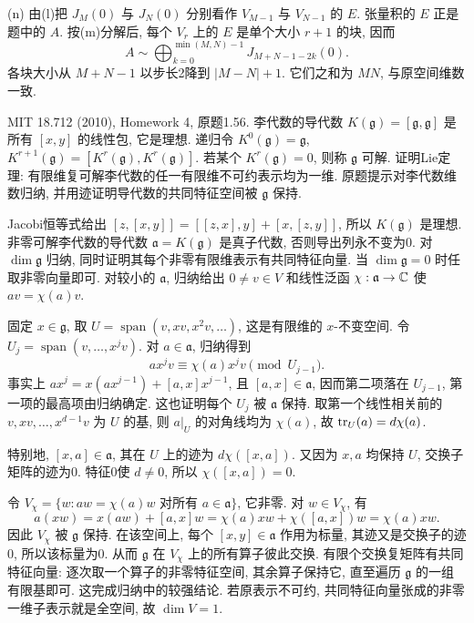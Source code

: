 \begin{solution}
(n) 由(l)把 $J_M(0)$ 与 $J_N(0)$ 分别看作 $V_{M-1}$ 与 $V_{N-1}$ 的 $E$. 张量积的 $E$ 正是题中的 $A$. 按(m)分解后, 每个 $V_r$ 上的 $E$ 是单个大小 $r+1$ 的块, 因而
\[
A\sim\bigoplus_{k=0}^{\min(M,N)-1}J_{M+N-1-2k}(0).
\]
各块大小从 $M+N-1$ 以步长2降到 $|M-N|+1$. 它们之和为 $MN$, 与原空间维数一致.
\end{solution}


\begin{exercise}\label{hw:1.56}
MIT 18.712 (2010), Homework 4, 原题1.56. 李代数的导代数 $K(\mathfrak g)=[\mathfrak g,\mathfrak g]$ 是所有 $[x,y]$ 的线性包, 它是理想. 递归令 $K^0(\mathfrak g)=\mathfrak g$, $K^{r+1}(\mathfrak g)=[K^r(\mathfrak g),K^r(\mathfrak g)]$. 若某个 $K^r(\mathfrak g)=0$, 则称 $\mathfrak g$ 可解. 证明Lie定理: 有限维复可解李代数的任一有限维不可约表示均为一维. 原题提示对李代数维数归纳, 并用迹证明导代数的共同特征空间被 $\mathfrak g$ 保持.
\end{exercise}
\begin{solution}
Jacobi恒等式给出 $[z,[x,y]]=[[z,x],y]+[x,[z,y]]$, 所以 $K(\mathfrak g)$ 是理想. 非零可解李代数的导代数 $\mathfrak a=K(\mathfrak g)$ 是真子代数, 否则导出列永不变为0. 对 $\dim\mathfrak g$ 归纳, 同时证明其每个非零有限维表示有共同特征向量. 当 $\dim\mathfrak g=0$ 时任取非零向量即可. 对较小的 $\mathfrak a$, 归纳给出 $0\ne v\in V$ 和线性泛函 $\chi:\mathfrak a\to\mathbb C$ 使 $av=\chi(a)v$.

固定 $x\in\mathfrak g$, 取 $U=\operatorname{span}(v,xv,x^2v,\ldots)$, 这是有限维的 $x$-不变空间. 令 $U_j=\operatorname{span}(v,\ldots,x^jv)$. 对 $a\in\mathfrak a$, 归纳得到
\[
a x^jv\equiv\chi(a)x^jv\pmod{U_{j-1}}.
\]
事实上 $ax^j=x(ax^{j-1})+[a,x]x^{j-1}$, 且 $[a,x]\in\mathfrak a$, 因而第二项落在 $U_{j-1}$, 第一项的最高项由归纳确定. 这也证明每个 $U_j$ 被 $\mathfrak a$ 保持. 取第一个线性相关前的 $v,xv,\ldots,x^{d-1}v$ 为 $U$ 的基, 则 $a|_U$ 的对角线均为 $\chi(a)$, 故 $\operatorname{tr}_U(a)=d\chi(a)$.

特别地, $[x,a]\in\mathfrak a$, 其在 $U$ 上的迹为 $d\chi([x,a])$. 又因为 $x,a$ 均保持 $U$, 交换子矩阵的迹为0. 特征0使 $d\ne0$, 所以 $\chi([x,a])=0$.

令 $V_\chi=\{w:aw=\chi(a)w\text{ 对所有 }a\in\mathfrak a\}$, 它非零. 对 $w\in V_\chi$, 有
\[
a(xw)=x(aw)+[a,x]w=\chi(a)xw+\chi([a,x])w=\chi(a)xw.
\]
因此 $V_\chi$ 被 $\mathfrak g$ 保持. 在该空间上, 每个 $[x,y]\in\mathfrak a$ 作用为标量, 其迹又是交换子的迹0, 所以该标量为0. 从而 $\mathfrak g$ 在 $V_\chi$ 上的所有算子彼此交换. 有限个交换复矩阵有共同特征向量: 逐次取一个算子的非零特征空间, 其余算子保持它, 直至遍历 $\mathfrak g$ 的一组有限基即可. 这完成归纳中的较强结论. 若原表示不可约, 共同特征向量张成的非零一维子表示就是全空间, 故 $\dim V=1$.
\end{solution}


